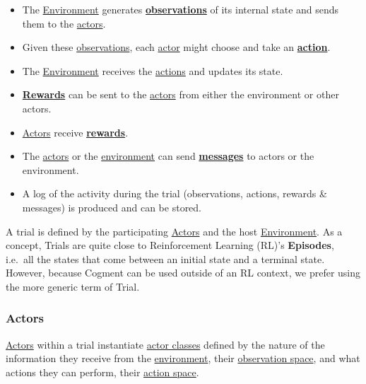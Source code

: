 \begin{itemize}
\tightlist
\item
  The \href{./glossary.md\#environment}{Environment} generates
  \href{./glossary.md\#observation}{\textbf{observations}} of its
  internal state and sends them to the
  \href{./glossary.md\#actor}{actors}.
\item
  Given these \href{./glossary.md\#observation}{observations}, each
  \href{./glossary.md\#actor}{actor} might choose and take an
  \href{./glossary.md\#action}{\textbf{action}}.
\item
  The \href{./glossary.md\#environment}{Environment} receives the
  \href{./glossary.md\#action}{actions} and updates its state.
\item
  \href{./glossary.md\#reward}{\textbf{Rewards}} can be sent to the
  \href{./glossary.md\#actor}{actors} from either the environment or
  other actors.
\item
  \href{./glossary.md\#actor}{Actors} receive
  \href{./glossary.md\#reward}{\textbf{rewards}}.
\item
  The \href{./glossary.md\#actor}{actors} or the
  \href{./glossary.md\#environment}{environment} can send
  \href{./glossary.md\#message}{\textbf{messages}} to actors or the
  environment.
\item
  A log of the activity during the trial (observations, actions, rewards
  \& messages) is produced and can be stored.
\end{itemize}

A trial is defined by the participating
\href{./glossary.md\#actor}{Actors} and the host
\href{./glossary.md\#environment}{Environment}. As a concept, Trials are
quite close to Reinforcement Learning (RL)'s \textbf{Episodes}, i.e.~all
the states that come between an initial state and a terminal state.
However, because Cogment can be used outside of an RL context, we prefer
using the more generic term of Trial.

\hypertarget{actors}{%
\subsubsection{Actors}\label{actors}}

\href{./glossary.md\#actor}{Actors} within a trial instantiate
\href{./glossary.md\#actor-class}{actor classes} defined by the nature
of the information they receive from the
\href{./glossary.md\#environment}{environment}, their
\href{./glossary.md\#observation-space}{observation space}, and what
actions they can perform, their
\href{./glossary.md\#action-space}{action space}.

